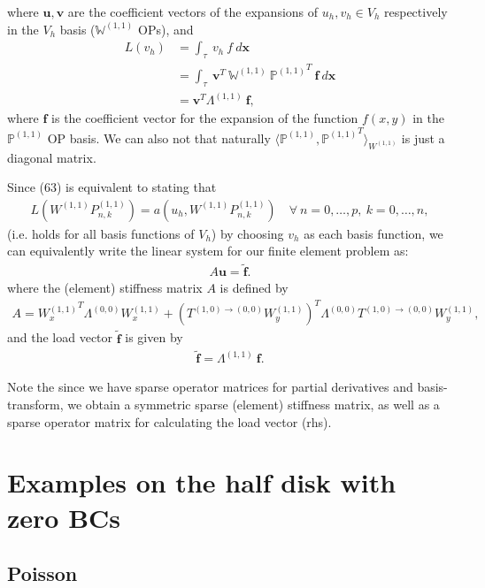 \documentclass[11pt, oneside]{article}   	%
\newcommand{\Wii}{W^{(1,1)}}
\newcommand{\Pii}{P^{(1,1)}}
\newcommand{\bigPii}{{\mathbb{P}^{(1,1)}}}
\newcommand{\element}{\tau}
\newcommand{\bigWii}{{\mathbb{W}^{(1,1)}}}
\begin{document}
where $\mathbf{u}, \mathbf{v}$ are the coefficient vectors of the expansions of $u_h, v_h \in V_h$ respectively in the $V_h$ basis ($\bigWii$ OPs), and
\begin{align}
	L(v_h) &= \int_\element \: v_h \: f \: d\mathbf{x} \\
	&= \int_\element \: \mathbf{v}^T \: \bigWii \: \bigPii^T \: \mathbf{f} \: d\mathbf{x} \\
	&= \mathbf{v}^T \Lambda^{(1,1)} \: \mathbf{f},
\end{align}
where $\mathbf{f}$ is the coefficient vector for the expansion of the function $f(x,y)$ in the $\bigPii$ OP basis. We can also not that naturally $\langle \bigPii, {\bigPii}^T \rangle_{\Wii}$ is just a diagonal matrix. 

Since (63) is equivalent to stating that
\begin{align}
	L(\Wii \Pii_{n,k}) = a(u_h,\Wii \Pii_{n,k}) \quad \forall \: n = 0,\dots,p, \: k = 0,\dots,n,
\end{align}
(i.e. holds for all basis functions of $V_h$) by choosing $v_h$ as each basis function, we can equivalently write the linear system for our finite element problem as:
\begin{align}
A\mathbf{u} = \tilde{\mathbf{f}}.
\end{align}
where the (element) stiffness matrix $A$ is defined by 
\begin{align}
A = {\Wii_x}^T \Lambda^{(0,0)} \Wii_x + ({T^{(1,0)\to(0,0)} \Wii_y})^T \Lambda^{(0,0)} T^{(1,0)\to(0,0)} \Wii_y, 
\end{align}
and the load vector $\tilde{\mathbf{f}}$ is given by 
\begin{align}
\tilde{\mathbf{f}} = \Lambda^{(1,1)} \: \mathbf{f}.
\end{align}

Note the since we have sparse operator matrices for partial derivatives and basis-transform, we obtain a symmetric sparse (element) stiffness matrix, as well as a sparse operator matrix for calculating the load vector (rhs).



%
\section{Examples on the half disk with zero BCs}


\subsection{Poisson}
\end{document}
